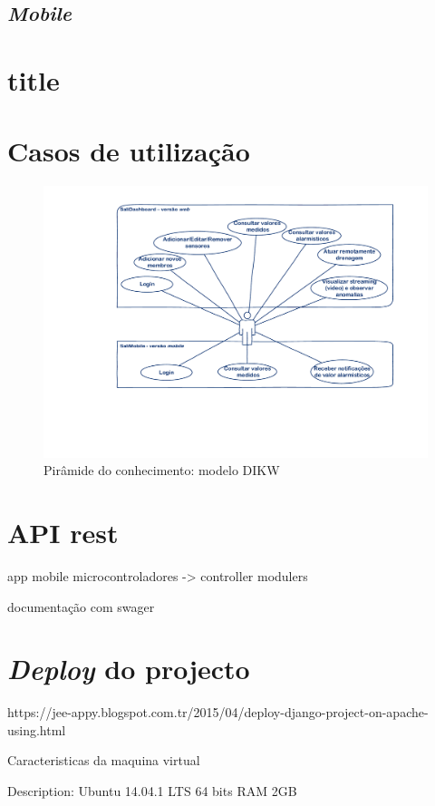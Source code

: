 \subsection{\textit{Mobile}}





\section{title}
\newpage 

\section{Casos de utilização}

\begin{figure}[!htb]
	\centering
	\includegraphics[scale=0.5]{esquemas/usecases.pdf}
	\caption{Pirâmide do conhecimento: modelo DIKW}
	\label{dikw}
\end{figure}








\section{API rest}



app mobile
microcontroladores -> controller modulers 


documentação com swager 



\section{\textit{Deploy} do projecto}

https://jee-appy.blogspot.com.tr/2015/04/deploy-django-project-on-apache-using.html

Caracteristicas da maquina virtual

Description:	Ubuntu 14.04.1 LTS
64 bits
RAM 2GB 



